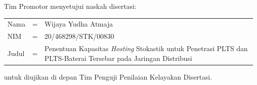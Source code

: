 {}
\vspace*{8pt}

\BgThispage

\noindent Tim Promotor menyetujui naskah disertasi:
\vspace*{-8pt}
{
\begin{longtable}{llp{340pt}}
	\hspace*{-6pt}Nama						& = & Wijaya Yudha Atmaja\\
	\hspace*{-6pt}NIM							& = & 20/468298/STK/00830\\
	\hspace*{-6pt}Judul	& = & Penentuan Kapasitas \textit{Hosting} Stokastik untuk Penetrasi PLTS dan PLTS-Baterai Tersebar pada Jaringan Distribusi
\end{longtable}
}
\vspace*{-22pt}
\noindent untuk diujikan di depan Tim Penguji Penilaian Kelayakan Disertasi.
\vspace*{5cm}

